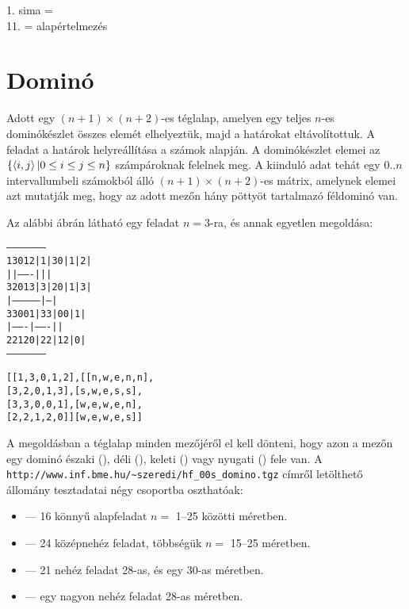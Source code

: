 1. sima = \\
11. = alapértelmezés



\section{Dominó}

Adott egy $(n+1)\times(n+2)$-es téglalap, amelyen egy teljes $n$-es dominókészlet
összes elemét elhelyeztük, majd a határokat eltávolítottuk. A feladat a határok
helyreállítása a számok alapján. A dominókészlet elemei az
$\{\left\langle i,j\right\rangle | 0 \leq i  \leq j \leq n \}$ számpároknak felelnek meg. A kiinduló
adat tehát egy $0..n$ intervallumbeli számokból álló $(n+1)\times(n+2)$-es mátrix,
amelynek elemei azt mutatják meg, hogy az adott mezőn hány pöttyöt tartalmazó féldominó
van.

Az alábbi ábrán látható egy feladat $n=3$-ra, és annak egyetlen megoldása:

\begin{alltt}
                                  ---------------------
     1   3   0   1   2            | 1 | 3   0 | 1 | 2 |
                                  |   |-------|   |   |
     3   2   0   1   3            | 3 | 2   0 | 1 | 3 |
                                  |---------------|---|
     3   3   0   0   1            | 3   3 | 0   0 | 1 |
                                  |-------|-------|   |
     2   2   1   2   0            | 2   2 | 1   2 | 0 |
                                  ---------------------

   % Bemenő adatformátum:         % A megoldás Prolog alakja:

   [[1,  3,  0,  1,  2],          [[n,  w,  e,  n,  n],
    [3,  2,  0,  1,  3],           [s,  w,  e,  s,  s],
    [3,  3,  0,  0,  1],           [w,  e,  w,  e,  n],
    [2,  2,  1,  2,  0]]           [w,  e,  w,  e,  s]]

\end{alltt}

A megoldásban a téglalap minden mezőjéről el kell dönteni, hogy azon a mezőn egy dominó
északi (), déli (), keleti () vagy nyugati () fele van. A
\verb'http://www.inf.bme.hu/~szeredi/hf_00s_domino.tgz' címről letölthető állomány
tesztadatai négy csoportba oszthatóak:

\begin{itemize}
\item {} --- 16 könnyű alapfeladat $n = $ 1--25 közötti méretben.
\item {} --- 24 középnehéz feladat, többségük $n = $ 15--25 méretben.
\item {} --- 21 nehéz feladat 28-as, és egy 30-as méretben.
\item {} --- egy nagyon nehéz feladat 28-as méretben.
\end{itemize}

